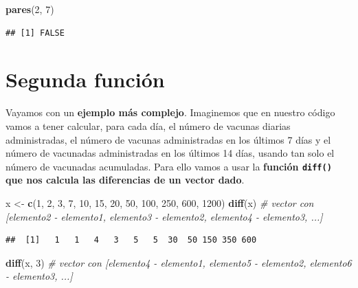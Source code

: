 \documentclass[11pt,]{book}
\newenvironment{Shaded}{\begin{snugshade}}{\end{snugshade}}
\newcommand{\CommentTok}[1]{\textcolor[rgb]{0.37,0.37,0.37}{\textit{#1}}}
\newcommand{\DecValTok}[1]{\textcolor[rgb]{0.06,0.06,0.06}{#1}}
\newcommand{\KeywordTok}[1]{\textcolor[rgb]{0.27,0.27,0.27}{\textbf{#1}}}
\newcommand{\NormalTok}[1]{#1}
\newcommand{\StringTok}[1]{\textcolor[rgb]{0.5,0.5,0.5}{#1}}
\begin{document}
\begin{Shaded}
\begin{Highlighting}[]
\KeywordTok{pares}\NormalTok{(}\DecValTok{2}\NormalTok{, }\DecValTok{7}\NormalTok{)}
\end{Highlighting}
\end{Shaded}

\begin{verbatim}
## [1] FALSE
\end{verbatim}

\hypertarget{segunda-funciuxf3n}{%
\section{Segunda función}\label{segunda-funciuxf3n}}

Vayamos con un \textbf{ejemplo más complejo}. Imaginemos que en nuestro código vamos a tener calcular, para cada día, el número de vacunas diarias administradas, el número de vacunas administradas en los últimos 7 días y el número de vacunadas administradas en los últimos 14 días, usando tan solo el número de vacunadas acumuladas. Para ello vamos a usar la \textbf{función \texttt{diff()} que nos calcula las diferencias de un vector dado}.

\begin{Shaded}
\begin{Highlighting}[]
\NormalTok{x <-}\StringTok{ }\KeywordTok{c}\NormalTok{(}\DecValTok{1}\NormalTok{, }\DecValTok{2}\NormalTok{, }\DecValTok{3}\NormalTok{, }\DecValTok{7}\NormalTok{, }\DecValTok{10}\NormalTok{, }\DecValTok{15}\NormalTok{, }\DecValTok{20}\NormalTok{, }\DecValTok{50}\NormalTok{, }\DecValTok{100}\NormalTok{, }\DecValTok{250}\NormalTok{, }\DecValTok{600}\NormalTok{, }\DecValTok{1200}\NormalTok{)}
\KeywordTok{diff}\NormalTok{(x) }\CommentTok{# vector con [elemento2 - elemento1, elemento3 - elemento2, elemento4 - elemento3, ...]}
\end{Highlighting}
\end{Shaded}

\begin{verbatim}
##  [1]   1   1   4   3   5   5  30  50 150 350 600
\end{verbatim}

\begin{Shaded}
\begin{Highlighting}[]
\KeywordTok{diff}\NormalTok{(x, }\DecValTok{3}\NormalTok{) }\CommentTok{# vector con [elemento4 - elemento1, elemento5 - elemento2, elemento6 - elemento3, ...]}
\end{Highlighting}
\end{Shaded}
\end{document}
